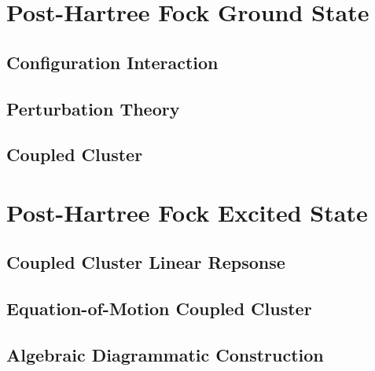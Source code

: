 \section{Post-Hartree Fock Ground State}

\subsection{Configuration Interaction}

\subsection{Perturbation Theory}

\subsection{Coupled Cluster}

\section{Post-Hartree Fock Excited State}

\subsection{Coupled Cluster Linear Repsonse}

\subsection{Equation-of-Motion Coupled Cluster}

\subsection{Algebraic Diagrammatic Construction}

